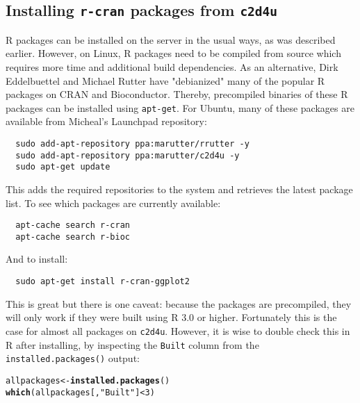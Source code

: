 \documentclass{scrartcl}\usepackage[]{graphicx}\usepackage[]{color}
\makeatletter
\newcommand{\hlnum}[1]{\textcolor[rgb]{0.686,0.059,0.569}{#1}}%
\newcommand{\hlstr}[1]{\textcolor[rgb]{0.192,0.494,0.8}{#1}}%
\newcommand{\hlopt}[1]{\textcolor[rgb]{0,0,0}{#1}}%
\newcommand{\hlstd}[1]{\textcolor[rgb]{0.345,0.345,0.345}{#1}}%
\newcommand{\hlkwb}[1]{\textcolor[rgb]{0.69,0.353,0.396}{#1}}%
\newcommand{\hlkwd}[1]{\textcolor[rgb]{0.737,0.353,0.396}{\textbf{#1}}}%
\newenvironment{kframe}{%
 \def\at@end@of@kframe{}%
 \ifinner\ifhmode%
  \def\at@end@of@kframe{\end{minipage}}%
  \begin{minipage}{\columnwidth}%
 \fi\fi%
 \def\FrameCommand##1{\hskip\@totalleftmargin \hskip-\fboxsep
 \colorbox{shadecolor}{##1}\hskip-\fboxsep
     \hskip-\linewidth \hskip-\@totalleftmargin \hskip\columnwidth}%
 \MakeFramed {\advance\hsize-\width
   \@totalleftmargin\z@ \linewidth\hsize
   \@setminipage}}%
 {\par\unskip\endMakeFramed%
 \at@end@of@kframe}
\newenvironment{knitrout}{}{} %
\makeatother
\begin{document}
\begin{appendices}

\section{Installing \texttt{r-cran} packages from \texttt{c2d4u}}
\label{c2d4u}

R packages can be installed on the server in the usual ways, as was described earlier. However, on Linux, R packages need to be compiled from source which requires more time and additional build dependencies. As an alternative, Dirk Eddelbuettel and Michael Rutter have "debianized" many of the popular R packages on CRAN and Bioconductor. Thereby, precompiled binaries of these R packages can be installed using \texttt{apt-get}. For Ubuntu, many of these packages are available from Micheal's Launchpad repository:

\begin{verbatim}
  sudo add-apt-repository ppa:marutter/rrutter -y
  sudo add-apt-repository ppa:marutter/c2d4u -y
  sudo apt-get update
\end{verbatim}
This adds the required repositories to the system and retrieves the latest package list. To see which packages are currently available:

\begin{verbatim}
  apt-cache search r-cran
  apt-cache search r-bioc
\end{verbatim}
And to install:

\begin{verbatim}
  sudo apt-get install r-cran-ggplot2
\end{verbatim}
This is great but there is one caveat: because the packages are precompiled, they will only work if they were built using R 3.0 or higher. Fortunately this is the case for almost all packages on \texttt{c2d4u}. However, it is wise to double check this in R after installing, by inspecting the \texttt{Built} column from the \texttt{installed.packages()} output:
\begin{knitrout}
\color{fgcolor}\begin{kframe}
\begin{alltt}
\hlstd{allpackages} \hlkwb{<-} \hlkwd{installed.packages}\hlstd{()}
\hlkwd{which}\hlstd{(allpackages[,} \hlstr{"Built"}\hlstd{]} \hlopt{<} \hlnum{3}\hlstd{)}
\end{alltt}
\end{kframe}
\end{knitrout}


\end{appendices}
\end{document}
